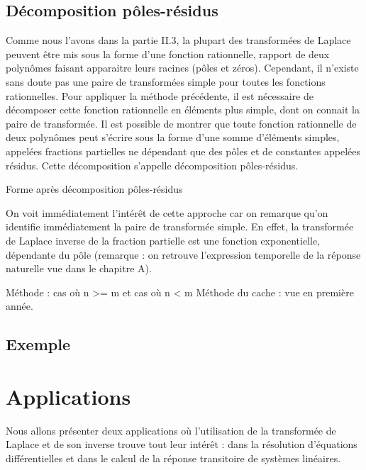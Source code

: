 \documentclass[]{book}
\begin{document}
{	\subsection{Décomposition pôles-résidus}
	Comme nous l'avons dans la partie II.3, la plupart des transformées de Laplace peuvent être mis sous la forme d'une fonction rationnelle, rapport de deux polynômes faisant apparaitre leurs racines (pôles et zéros). Cependant, il n'existe sans doute pas une paire de transformées simple pour toutes les fonctions rationnelles. Pour appliquer la méthode précédente, il est nécessaire de décomposer cette fonction rationnelle en éléments plus simple, dont on connait la paire de transformée.
	Il est possible de montrer que toute fonction rationnelle de deux polynômes peut s'écrire sous la forme d'une somme d'éléments simples, appelées fractions partielles ne dépendant que des pôles et de constantes appelées résidus. Cette décomposition s'appelle décomposition pôles-résidus. 
	
	Forme après décomposition pôles-résidus
	
	On voit immédiatement l'intérêt de cette approche car on remarque qu'on identifie immédiatement la paire de transformée simple. En effet, la transformée de Laplace inverse de la fraction partielle est une fonction exponentielle, dépendante du pôle (remarque : on retrouve l'expression temporelle de la réponse naturelle vue dans le chapitre A).
	
	Méthode : cas où n >= m et cas où n < m
	Méthode du cache : vue en première année.
	
	\subsection{Exemple}
	
	\section{Applications} 
	Nous allons présenter deux applications où l'utilisation de la transformée de Laplace et de son inverse trouve tout leur intérêt : dans la résolution d'équations différentielles et dans le calcul de la réponse transitoire de systèmes linéaires.
}
\end{document}
